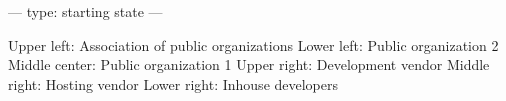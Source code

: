 ---
type: starting state
---

Upper left: Association of public organizations
Lower left: Public organization 2
Middle center: Public organization 1
Upper right: Development vendor
Middle right: Hosting vendor
Lower right: Inhouse developers
